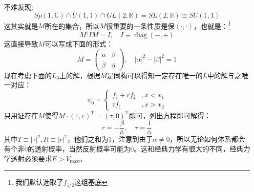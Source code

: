 不难发现:
\begin{equation}
	Sp(1,\mathbb{C})\cap U(1,1)\cap GL(2,\mathbb{R})=SL(2,\mathbb{R})\cong SU(1,1)
\end{equation}
这其实就是$M$所在的集合，所以$M$很重要的一条性质是保$\left<\cdot,\cdot\right>$，也就是：\footnote{我们默认选取了$f_{1/2}$这组基底}
\begin{equation}
	M^\dagger I M =I,\quad I\equiv\operatorname{diag}(-,+)
\end{equation}
这直接导致$M$可以写成下面的形式：
\begin{equation}
	M=\begin{pmatrix}
		\alpha&\bar\beta \\
		\bar\beta&\bar\alpha
	\end{pmatrix},\quad |\alpha|^2-|\beta|^2=1
\end{equation}
现在考虑下面的$L_0$上的解，根据$M$是同构可以得知一定存在唯一的$L$中的解与之唯一对应：
\begin{equation}
	\psi_0=\begin{cases}
		f_1+r f_2&,x<x_1\\
		\tau f_1&,x>x_2
	\end{cases}
\end{equation}
只用证存在$M$使得$M\cdot (1,r)^\mathrm{T}=(\tau,0)^\mathrm{T}$即可，列出方程即可解得：
\begin{equation}
	r=-\frac{\beta}{\bar\alpha},\quad \tau=\frac{1}{\bar\alpha}
\end{equation}
其中$T\equiv|\tau|^2,R\equiv|r|^2$，他们之和为1，注意到由于$\alpha\neq 0$，所以无论如何体系都会有个非0的透射概率，当然反射概率可能为0。这和经典力学有很大的不同，经典力学透射必须要求$E>V_{\max}$。